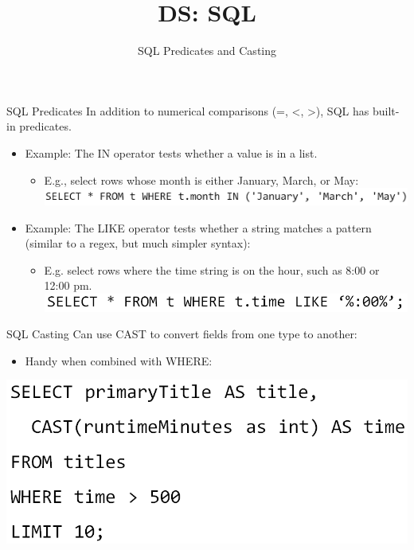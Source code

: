 \documentclass[aspectratio=169]{../latex_main/tntbeamer}  %
\title[Introduction]{DS: SQL}
\subtitle{SQL Predicates and Casting}
\begin{document}
	
	\maketitle
	\begin{frame}{SQL Predicates}
	    In addition to numerical comparisons (=, <, >), SQL has built-in predicates.
	    \begin{itemize}
	        \item Example: The IN operator tests whether a value is in a list.
	        \begin{itemize}
	            \item E.g., select rows whose month is either January, March, or May:
	            \includegraphics[scale=.4]{Bild27}
	        \end{itemize}
	    \end{itemize}
	    
	    
	    \begin{itemize}
	        \item Example: The LIKE operator tests whether a string matches a pattern (similar to a regex, but much simpler syntax):
	        \begin{itemize}
	            \item E.g. select rows where the time string is on the hour, such as 8:00 or 12:00 pm.
	            \includegraphics[scale=.4]{Bild28}
	        \end{itemize}
	    \end{itemize}
	\end{frame}
	
	
	\begin{frame}{SQL Casting}
	    Can use CAST to convert fields from one type to another:
	    \begin{itemize}
	        \item Handy when combined with WHERE:
	    \end{itemize}
	    \vspace{1cm}
	    \includegraphics[scale=.45]{Bild29}
	\end{frame}
	
	
	
	
\end{document}
